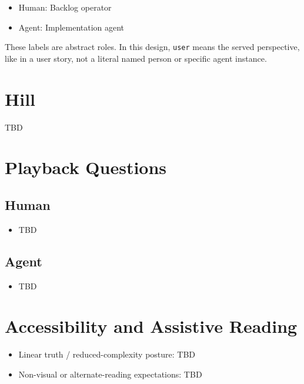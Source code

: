 \begin{itemize}
\tightlist
\item
  Human: Backlog operator
\item
  Agent: Implementation agent
\end{itemize}

These labels are abstract roles. In this design, \texttt{u\allowbreak{}s\allowbreak{}e\allowbreak{}r} means the served perspective, like in a user story, not a literal named person or specific agent instance.

\section{Hill}\label{record-258-hill}

TBD

\section{Playback Questions}\label{record-258-playback-questions}

\subsection{Human}\label{record-258-human}

\begin{itemize}
\tightlist
\item[$\square$]
  TBD
\end{itemize}

\subsection{Agent}\label{record-258-agent}

\begin{itemize}
\tightlist
\item[$\square$]
  TBD
\end{itemize}

\section{Accessibility and Assistive Reading}\label{record-258-accessibility-and-assistive-reading}

\begin{itemize}
\tightlist
\item
  Linear truth / reduced-complexity posture: TBD
\item
  Non-visual or alternate-reading expectations: TBD
\end{itemize}


